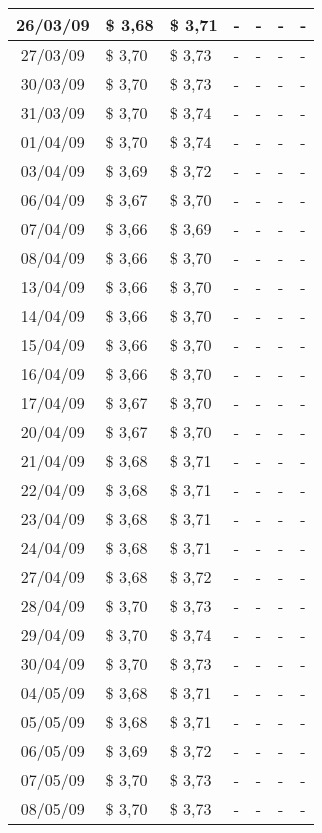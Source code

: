 \begin{center}
\begin{longtable}{|c|p{1.5cm}|p{1.5cm}|p{1.5cm}|p{1.5cm}|p{1.5cm}|p{1.5cm}|}
26/03/09 & \$ 3,68 & \$ 3,71 & - & - & - & - \\ \hline
27/03/09 & \$ 3,70 & \$ 3,73 & - & - & - & - \\ \hline
30/03/09 & \$ 3,70 & \$ 3,73 & - & - & - & - \\ \hline
31/03/09 & \$ 3,70 & \$ 3,74 & - & - & - & - \\ \hline
01/04/09 & \$ 3,70 & \$ 3,74 & - & - & - & - \\ \hline
03/04/09 & \$ 3,69 & \$ 3,72 & - & - & - & - \\ \hline
06/04/09 & \$ 3,67 & \$ 3,70 & - & - & - & - \\ \hline
07/04/09 & \$ 3,66 & \$ 3,69 & - & - & - & - \\ \hline
08/04/09 & \$ 3,66 & \$ 3,70 & - & - & - & - \\ \hline
13/04/09 & \$ 3,66 & \$ 3,70 & - & - & - & - \\ \hline
14/04/09 & \$ 3,66 & \$ 3,70 & - & - & - & - \\ \hline
15/04/09 & \$ 3,66 & \$ 3,70 & - & - & - & - \\ \hline
16/04/09 & \$ 3,66 & \$ 3,70 & - & - & - & - \\ \hline
17/04/09 & \$ 3,67 & \$ 3,70 & - & - & - & - \\ \hline
20/04/09 & \$ 3,67 & \$ 3,70 & - & - & - & - \\ \hline
21/04/09 & \$ 3,68 & \$ 3,71 & - & - & - & - \\ \hline
22/04/09 & \$ 3,68 & \$ 3,71 & - & - & - & - \\ \hline
23/04/09 & \$ 3,68 & \$ 3,71 & - & - & - & - \\ \hline
24/04/09 & \$ 3,68 & \$ 3,71 & - & - & - & - \\ \hline
27/04/09 & \$ 3,68 & \$ 3,72 & - & - & - & - \\ \hline
28/04/09 & \$ 3,70 & \$ 3,73 & - & - & - & - \\ \hline
29/04/09 & \$ 3,70 & \$ 3,74 & - & - & - & - \\ \hline
30/04/09 & \$ 3,70 & \$ 3,73 & - & - & - & - \\ \hline
04/05/09 & \$ 3,68 & \$ 3,71 & - & - & - & - \\ \hline
05/05/09 & \$ 3,68 & \$ 3,71 & - & - & - & - \\ \hline
06/05/09 & \$ 3,69 & \$ 3,72 & - & - & - & - \\ \hline
07/05/09 & \$ 3,70 & \$ 3,73 & - & - & - & - \\ \hline
08/05/09 & \$ 3,70 & \$ 3,73 & - & - & - & - \\ \hline

\end{longtable}
\end{center}
